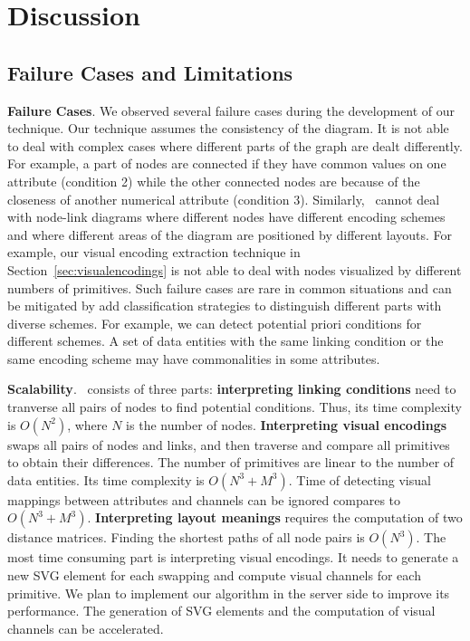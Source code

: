 \section{Discussion}


\subsection{Failure Cases and Limitations}
\textbf{Failure Cases}.
We observed several failure cases during the development of our technique.
Our technique assumes the consistency of the diagram.
It is not able to deal with complex cases where different parts of the graph are dealt differently.
For example, a part of nodes are connected if they have common values on one attribute (condition 2) while the other connected nodes are because of the closeness of another numerical attribute (condition 3).
Similarly, \ApproachName~cannot deal with node-link diagrams where different nodes have different encoding schemes and where different areas of the diagram are positioned by different layouts.
For example, our visual encoding extraction technique in Section~\ref{sec:visualencodings} is not able to deal with nodes visualized by different numbers of primitives.
Such failure cases are rare in common situations and can be mitigated by add classification strategies to distinguish different parts with diverse schemes.
For example, we can detect potential priori conditions for different schemes.
A set of data entities with the same linking condition or the same encoding scheme may have commonalities in some attributes.

\textbf{Scalability}.
\ApproachName~consists of three parts:
\textbf{interpreting linking conditions} need to tranverse all pairs of nodes to find potential conditions.
Thus, its time complexity is $O(N^2)$, where $N$ is the number of nodes.
\textbf{Interpreting visual encodings} swaps all pairs of nodes and links, and then traverse and compare all primitives to obtain their differences.
The number of primitives are linear to the number of data entities.
Its time complexity is $O(N^3 + M^3)$.
Time of detecting visual mappings between attributes and channels can be ignored compares to $O(N^3 + M^3)$.
\textbf{Interpreting layout meanings} requires the computation of two distance matrices.
Finding the shortest paths of all node pairs is $O(N^3)$.
The most time consuming part is interpreting visual encodings.
It needs to generate a new SVG element for each swapping and compute visual channels for each primitive.
We plan to implement our algorithm in the server side to improve its performance.
The generation of SVG elements and the computation of visual channels can be accelerated.